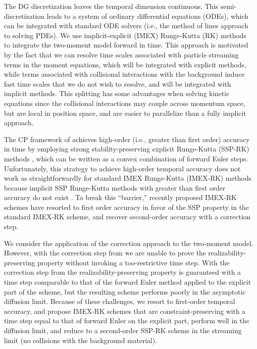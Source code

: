 The DG discretization leaves the temporal dimension continuous.  
This semi-discretization leads to a system of ordinary differential equations (ODEs), which can be integrated with standard ODE solvers (i.e., the method of lines approach to solving PDEs).  
We use implicit-explicit (IMEX) Runge-Kutta (RK) methods \cite{ascher_etal_1997,pareschiRusso_2005} to integrate the two-moment model forward in time.  
This approach is motivated by the fact that we can resolve time scales associated with particle streaming terms in the moment equations, which will be integrated with explicit methods, while terms associated with collisional interactions with the background induce fast time scales that we do not wish to resolve, and will be integrated with implicit methods.  
This splitting has some advantages when solving kinetic equations since the collisional interactions may couple across momentum space, but are local in position space, and are easier to parallelize than a fully implicit approach.  

The CP framework of \cite{zhangShu_2010a} achieves high-order (i.e., greater than first order) accuracy in time by employing strong stability-preserving explicit Runge-Kutta (SSP-RK) methods \cite{shuOsher_1988,gottlieb_etal_2001}, which can be written as a convex combination of forward Euler steps.  
Unfortunately, this strategy to achieve high-order temporal accuracy does not work as straightforwardly for standard IMEX Runge-Kutta (IMEX-RK) methods because implicit SSP Runge-Kutta methods with greater than first order accuracy do not exist \cite{gottlieb_etal_2001}.  
To break this ``barrier,'' recently proposed IMEX-RK schemes \cite{chertock_etal_2015,hu_etal_2018} have resorted to first order accuracy in favor of the SSP property in the standard IMEX-RK scheme, and recover second-order accuracy with a correction step.  

We consider the application of the correction approach to the two-moment model.  
However, with the correction step from \cite{chertock_etal_2015} we are unable to prove the realizability-preserving property without invoking a too-restrictive time step.  
With the correction step from \cite{hu_etal_2018} the realizability-preserving property is guaranteed with a time step comparable to that of the forward Euler method applied to the explicit part of the scheme, but the resulting scheme performs poorly in the asymptotic diffusion limit.  
Because of these challenges, we resort to first-order temporal accuracy, and propose IMEX-RK schemes that are constraint-preserving with a time step equal to that of forward Euler on the explicit part, perform well in the diffusion limit, and reduce to a second-order SSP-RK scheme in the streaming limit (no collisions with the background material).  

